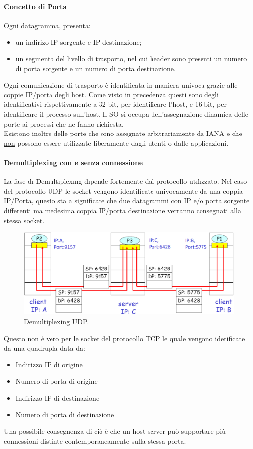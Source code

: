 \paragraph{Concetto di Porta}
Ogni datagramma, presenta:
\begin{itemize}
    \item un indirizo IP sorgente e IP destinazione;
    \item un segmento del livello di trasporto, nel cui header sono presenti un numero di porta sorgente e un numero di porta destinazione.
\end{itemize}
Ogni comunicazione di trasporto è identificata in maniera univoca grazie alle coppie IP/porta degli host. Come visto in precedenza questi sono degli identificativi rispettivamente a 32 bit, per identificare l'host, e 16 bit, per identificare il processo sull'host. Il SO si occupa dell'assegnazione dinamica delle porte ai processi che ne fanno richiesta.
\\Esistono inoltre delle porte che sono assegnate arbitrariamente da IANA e che \underline{non} possono essere utilizzate liberamente dagli utenti o dalle applicazioni.

\paragraph{Demultiplexing con e senza connessione}
La fase di Demultiplexing dipende fortemente dal protocollo utilizzato. Nel caso del protocollo UDP le socket vengono identificate univocamente da una coppia IP/Porta, questo sta a significare che due datagrammi con IP e/o porta sorgente differenti ma medesima coppia IP/porta destinazione verranno consegnati alla stessa socket.

\begin{figure}[h]
    \centering
    \includegraphics[scale=0.4]{Immagini/DemultiplexingUDP.png}
    \caption{Demultiplexing UDP.}
\end{figure}

Questo non è vero per le socket del protocollo TCP le quale vengono idetificate da una quadrupla data da:
\begin{itemize}
    \item Indirizzo IP di origine
    \item Numero di porta di origine
    \item Indirizzo IP di destinazione
    \item Numero di porta di destinazione
\end{itemize}
Una possibile consegnenza di ciò è che un host server può supportare più connessioni distinte contemporaneamente sulla stessa porta.

